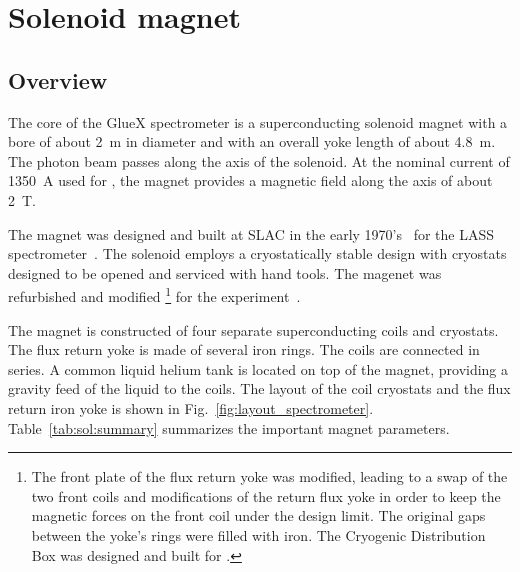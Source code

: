
\section[Solenoid Magnet]{Solenoid magnet 
  \label{sec:solenoid}
}

\subsection[Overview]{Overview \label{sec:sol:overview}
}

The core of the GlueX spectrometer is a superconducting
solenoid magnet with a bore of about 2~m in diameter and with an overall 
yoke length of about 4.8~m. The photon beam passes along the axis of
the solenoid.  At the nominal current of 1350~A used for \gx{}, the magnet provides a magnetic field along the axis of about 2~T.

The magnet was designed and built at SLAC in the early
1970's~\cite{Alcorn-confer-1972} for the LASS
spectrometer~\cite{Aston:1987uc}. The solenoid employs a cryostatically
stable design with cryostats designed to be opened and
serviced with hand tools. The magenet was refurbished and modified%
\footnote{
  The front plate of the flux return yoke was modified, leading to a
  swap of the two front coils and modifications of the return flux
  yoke in order to keep the magnetic forces on the front coil under
  the design limit.  The original gaps between the yoke's rings were
  filled with iron. The Cryogenic Distribution Box was designed and
  built for \gx{}.
} 
for the \gx{} experiment~\cite{Ballard:2011tm, Ballard:2015wma}. 

The magnet is constructed of four separate superconducting coils and
cryostats. The flux return yoke is made of several iron rings.  The
coils are connected in series. A common liquid helium tank is located
on top of the magnet, providing a gravity feed of the liquid to the
coils. The layout of the coil cryostats and the flux return iron
yoke is shown in Fig.~\ref{fig:layout_spectrometer}.
Table~\ref{tab:sol:summary} summarizes the important magnet
parameters.

  

